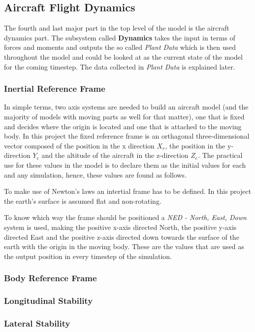 \subsection{Aircraft Flight Dynamics}

The fourth and last major part in the top level of the model is the aircraft dynamics part. The subsystem called \textbf{Dynamics} takes the input in terms of forces and moments and outputs the so called \textit{Plant Data} which is then used throughout the model and could be looked at as the current state of the model for the coming timestep. The data collected in \textit{Plant Data} is explained later.

\subsubsection{Inertial Reference Frame}

In simple terms, two axis systems are needed to build an aircraft model (and the majority of models with moving parts as well for that matter), one that is fixed and decides where the origin is located and one that is attached to the moving body. In this project the fixed reference frame is an orthagonal three-dimensional vector composed of the position in the x direction $X_e$, the position in the y-direction $Y_e$ and the altitude of the aircraft in the z-direction $Z_e$. The practical use for these values in the model is to declare them as the initial values for each and any simulation, hence, these values are found as follows.


%
%
To make use of Newton's laws an intertial frame has to be defined. In this project the earth's surface is assumed flat and non-rotating.
%

To know which way the frame should be positioned a \textit{NED - North, East, Down} system is used, making the positive x-axis directed North, the positive y-axis directed East and the positive z-axis directed down towards the surface of the earth with the origin in the moving body. These are the values that are used as the output position in every timestep of the simulation. 

\subsubsection{Body Reference Frame}




\subsubsection{Longitudinal Stability}
\subsubsection{Lateral Stability}



